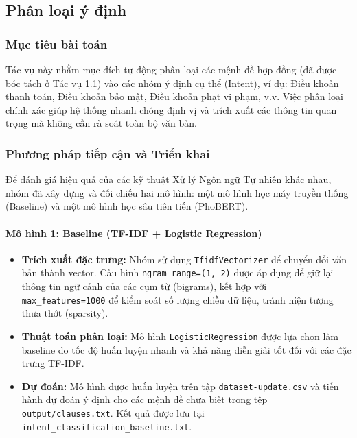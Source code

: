 \subsection{Phân loại ý định}

\subsubsection{Mục tiêu bài toán}
Tác vụ này nhằm mục đích tự động phân loại các mệnh đề hợp đồng (đã được bóc tách ở Tác vụ 1.1) vào các nhóm ý định cụ thể (Intent), ví dụ: Điều khoản thanh toán, Điều khoản bảo mật, Điều khoản phạt vi phạm, v.v. Việc phân loại chính xác giúp hệ thống nhanh chóng định vị và trích xuất các thông tin quan trọng mà không cần rà soát toàn bộ văn bản.

\subsubsection{Phương pháp tiếp cận và Triển khai}
Để đánh giá hiệu quả của các kỹ thuật Xử lý Ngôn ngữ Tự nhiên khác nhau, nhóm đã xây dựng và đối chiếu hai mô hình: một mô hình học máy truyền thống (Baseline) và một mô hình học sâu tiên tiến (PhoBERT).

\paragraph{Mô hình 1: Baseline (TF-IDF + Logistic Regression)}
\begin{itemize}
    \item \textbf{Trích xuất đặc trưng:} Nhóm sử dụng \texttt{TfidfVectorizer} để chuyển đổi văn bản thành vector. Cấu hình \texttt{ngram\_range=(1, 2)} được áp dụng để giữ lại thông tin ngữ cảnh của các cụm từ (bigrams), kết hợp với \texttt{max\_features=1000} để kiểm soát số lượng chiều dữ liệu, tránh hiện tượng thưa thớt (sparsity).
    \item \textbf{Thuật toán phân loại:} Mô hình \texttt{LogisticRegression} được lựa chọn làm baseline do tốc độ huấn luyện nhanh và khả năng diễn giải tốt đối với các đặc trưng TF-IDF.
    \item \textbf{Dự đoán:} Mô hình được huấn luyện trên tập \texttt{dataset-update.csv} và tiến hành dự đoán ý định cho các mệnh đề chưa biết trong tệp \texttt{output/clauses.txt}. Kết quả được lưu tại \texttt{intent\_classification\_baseline.txt}.
\end{itemize}

